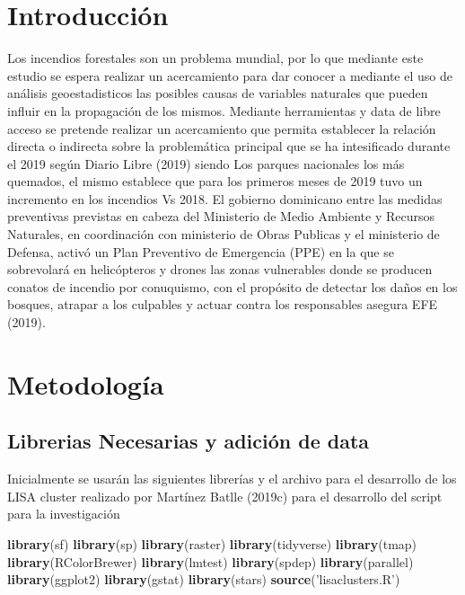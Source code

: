 \documentclass[11pt,]{article}
\newenvironment{Shaded}{\begin{snugshade}}{\end{snugshade}}
\newcommand{\KeywordTok}[1]{\textcolor[rgb]{0.13,0.29,0.53}{\textbf{#1}}}
\newcommand{\StringTok}[1]{\textcolor[rgb]{0.31,0.60,0.02}{#1}}
\newcommand{\NormalTok}[1]{#1}
\begin{document}
\vskip 6.5pt


\noindent  \section{Introducción}\label{introducciuxf3n}

Los incendios forestales son un problema mundial, por lo que mediante
este estudio se espera realizar un acercamiento para dar conocer a
mediante el uso de análisis geoestadisticos las posibles causas de
variables naturales que pueden influir en la propagación de los mismos.
Mediante herramientas y data de libre acceso se pretende realizar un
acercamiento que permita establecer la relación directa o indirecta
sobre la problemática principal que se ha intesificado durante el 2019
según Diario Libre (2019) siendo Los parques nacionales los más
quemados, el mismo establece que para los primeros meses de 2019 tuvo un
incremento en los incendios Vs 2018. El gobierno dominicano entre las
medidas preventivas previstas en cabeza del Ministerio de Medio Ambiente
y Recursos Naturales, en coordinación con ministerio de Obras Publicas y
el ministerio de Defensa, activó un Plan Preventivo de Emergencia (PPE)
en la que se sobrevolará en helicópteros y drones las zonas vulnerables
donde se producen conatos de incendio por conuquismo, con el propósito
de detectar los daños en los bosques, atrapar a los culpables y actuar
contra los responsables asegura EFE (2019).

\section{Metodología}\label{metodologuxeda}

\subsection{Librerias Necesarias y adición de
data}\label{librerias-necesarias-y-adiciuxf3n-de-data}

Inicialmente se usarán las siguientes librerías y el archivo para el
desarrollo de los LISA cluster realizado por Martínez Batlle (2019c)
para el desarrollo del script para la investigación

\begin{Shaded}
\begin{Highlighting}[]
\KeywordTok{library}\NormalTok{(sf)}
\KeywordTok{library}\NormalTok{(sp)}
\KeywordTok{library}\NormalTok{(raster)}
\KeywordTok{library}\NormalTok{(tidyverse)}
\KeywordTok{library}\NormalTok{(tmap)}
\KeywordTok{library}\NormalTok{(RColorBrewer)}
\KeywordTok{library}\NormalTok{(lmtest)}
\KeywordTok{library}\NormalTok{(spdep)}
\KeywordTok{library}\NormalTok{(parallel)}
\KeywordTok{library}\NormalTok{(ggplot2)}
\KeywordTok{library}\NormalTok{(gstat)}
\KeywordTok{library}\NormalTok{(stars)}
\KeywordTok{source}\NormalTok{(}\StringTok{'lisaclusters.R'}\NormalTok{)}
\end{Highlighting}
\end{Shaded}
\end{document}
